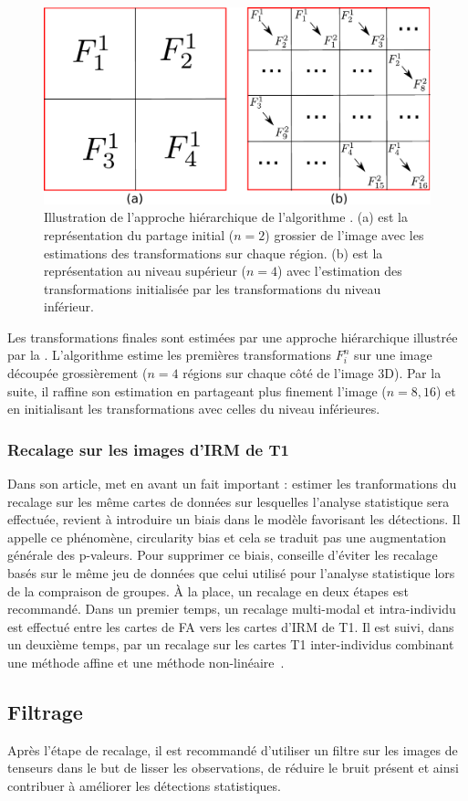 \begin{figure}[htpb]
    \centering
    \includegraphics[scale=0.7]{Images/dtitk_hierarchie.pdf}
    \caption{\label{fig_dtitk_hierarchie}Illustration de l'approche hiérarchique de l'algorithme \dtitk.
    (a) est la représentation du partage initial ($n=2$) grossier de l'image avec les estimations des transformations sur chaque région.
    (b) est la représentation au niveau supérieur ($n=4$) avec l'estimation des transformations initialisée par les transformations du niveau inférieur.}
\end{figure}
Les transformations finales sont estimées par une approche hiérarchique illustrée par la .
L'algorithme estime les premières transformations $F_i^{n}$ sur une image découpée grossièrement ($n=4$ régions sur chaque côté de l'image 3D).
Par la suite, il raffine son estimation en partageant plus finement l'image ($n=8, 16$) et en initialisant les transformations avec celles du niveau inférieures.

\subsubsection*{Recalage sur les images d'IRM de T1}
Dans son article, \cite{Tustison2014} met en avant un fait important :
estimer les tranformations du recalage sur les même cartes de données sur lesquelles l'analyse statistique
sera effectuée, revient à introduire un biais dans le modèle favorisant les détections.
Il appelle ce phénomène, \og circularity bias \fg et cela se traduit pas une augmentation générale des p-valeurs.
Pour supprimer ce biais, \cite{Tustison2014} conseille d'éviter les recalage basés sur le même jeu de données 
que celui utilisé pour l'analyse statistique lors de la compraison de groupes.
À la place, un recalage en deux étapes est recommandé. 
Dans un premier temps, un recalage multi-modal et intra-individu est effectué entre les cartes de FA vers les cartes d'IRM de T1.
Il est suivi, dans un deuxième temps, par un recalage sur les cartes T1 inter-individus combinant une méthode affine et une méthode non-linéaire~\cite{Noblet2006}.


\subsection{Filtrage}


Après l'étape de recalage, il est recommandé d'utiliser un filtre sur les images de tenseurs dans le but de lisser les observations, de réduire le bruit présent et ainsi contribuer à améliorer les détections statistiques.
